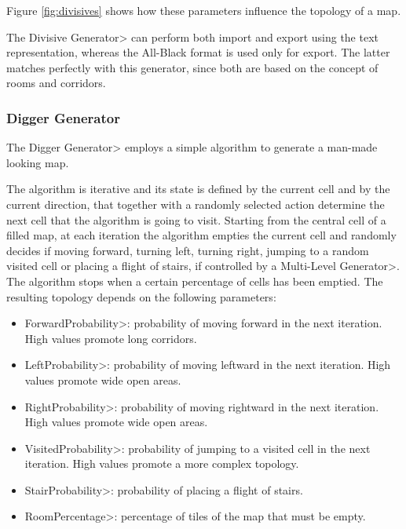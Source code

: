 Figure \ref{fig:divisives} shows how these parameters influence the topology of a map.

\par

The \<Divisive Generator> can perform both import and export using the text representation, whereas the All-Black format is used only for export. The latter matches perfectly with this generator, since both are based on the concept of rooms and corridors.


\subsubsection{Digger Generator}

The \<Digger Generator> employs a simple algorithm to generate a man-made looking map.

\par

The algorithm is iterative and its state is defined by the current cell and by the current direction, that together with a randomly selected action determine the next cell that the algorithm is going to visit. Starting from the central cell of a filled map, at each iteration the algorithm empties the current cell and randomly decides if moving forward, turning left, turning right, jumping to a random visited cell or placing a flight of stairs, if controlled by a \<Multi-Level Generator>. The algorithm stops when a certain percentage of cells has been emptied. The resulting topology depends on the following parameters:

\begin{itemize}
\item \<ForwardProbability>: probability of moving forward in the next iteration. High values promote long corridors. 
\item \<LeftProbability>: probability of moving leftward in the next iteration. High values promote wide open areas. 
\item \<RightProbability>: probability of moving rightward in the next iteration. High values promote wide open areas. 
\item \<VisitedProbability>: probability of jumping to a visited cell in the next iteration. High values promote a more complex topology. 
\item \<StairProbability>: probability of placing a flight of stairs.
\item \<RoomPercentage>: percentage of tiles of the map that must be empty.
\end{itemize}


